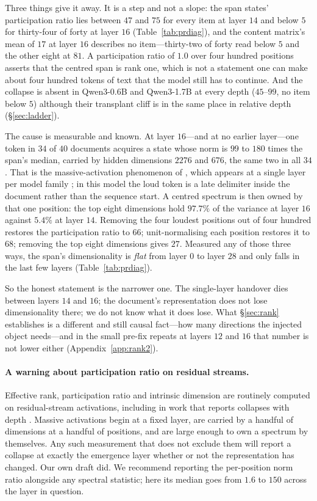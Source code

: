 \documentclass{article}
\begin{document}
Three things give it away. It is a step and not a slope: the span states'
participation ratio lies between $47$ and $75$ for every item at layer $14$ and
below $5$ for thirty-four of forty at layer $16$ (Table~\ref{tab:prdiag}), and
the content matrix's mean of $17$ at layer $16$ describes no item---thirty-two
of forty read below $5$ and the other eight at $81$. A participation ratio of
$1.0$ over four hundred positions asserts that the centred span is rank one,
which is not a statement one can make about four hundred tokens of text that
the model still has to continue. And the collapse is absent in Qwen3-0.6B and
Qwen3-1.7B at every depth ($45$--$99$, no item below $5$) although their
transplant cliff is in the same place in relative depth
(\S\ref{sec:ladder}).

The cause is measurable and known. At layer $16$---and at no earlier layer---one
token in $34$ of $40$ documents acquires a state whose norm is $99$ to $180$ times the
span's median, carried by hidden dimensions $2276$ and $676$, the same two in
all $34$. That is the massive-activation phenomenon of
\citet{sun2024massive}, which appears at a single layer per model family
\citep{shi2026melayer}; in this model the loud token is a late delimiter inside
the document rather than the sequence start. A centred spectrum is then owned by
that one position: the top eight dimensions hold $97.7\%$ of the variance at
layer $16$ against $5.4\%$ at layer $14$. Removing the four loudest positions
out of four hundred restores the participation ratio to $66$; unit-normalising
each position restores it to $68$; removing the top eight dimensions gives $27$.
Measured any of those three ways, the span's dimensionality is
\emph{flat} from layer $0$ to layer $28$ and only falls in the last few layers
(Table~\ref{tab:prdiag}).

So the honest statement is the narrower one. The single-layer handover dies
between layers $14$ and $16$; the document's representation does not lose
dimensionality there; we do not know what it does lose. What \S\ref{sec:rank}
establishes is a different and still causal fact---how many directions the
injected object needs---and in the small pre-fix repeats at layers $12$ and
$16$ that number is not lower either (Appendix~\ref{app:rank2}).



\paragraph{A warning about participation ratio on residual streams.} Effective
rank, participation ratio and intrinsic dimension are routinely computed on
residual-stream activations, including in work that reports collapses with depth
\citep{fernando2026residualspectral, sarkar2026causaldim}. Massive activations
begin at a fixed layer, are carried by a handful of dimensions at a handful of
positions, and are large enough to own a spectrum by themselves. Any such
measurement that does not exclude them will report a collapse at exactly the
emergence layer whether or not the representation has changed. Our own draft did.
We recommend reporting the per-position norm ratio alongside any spectral
statistic; here its median goes from $1.6$ to $150$ across the layer in question.
\end{document}
